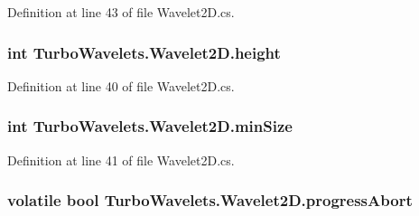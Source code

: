 \-Definition at line 43 of file \-Wavelet2\-D.\-cs.

\hypertarget{class_turbo_wavelets_1_1_wavelet2_d_afb2aa87b89b82f329357cbdc0cde18a8}{
\subsubsection[{height}]{\setlength{\rightskip}{0pt plus 5cm}int {\bf \-Turbo\-Wavelets.\-Wavelet2\-D.\-height}}}\label{class_turbo_wavelets_1_1_wavelet2_d_afb2aa87b89b82f329357cbdc0cde18a8}


\-Definition at line 40 of file \-Wavelet2\-D.\-cs.

\hypertarget{class_turbo_wavelets_1_1_wavelet2_d_af5148ef1a46dd5694ccea13aa8f1b9e2}{
\subsubsection[{min\-Size}]{\setlength{\rightskip}{0pt plus 5cm}int {\bf \-Turbo\-Wavelets.\-Wavelet2\-D.\-min\-Size}}}\label{class_turbo_wavelets_1_1_wavelet2_d_af5148ef1a46dd5694ccea13aa8f1b9e2}


\-Definition at line 41 of file \-Wavelet2\-D.\-cs.

\hypertarget{class_turbo_wavelets_1_1_wavelet2_d_adb4984a01d9ab29c0056b18cbbcdef6f}{
\subsubsection[{progress\-Abort}]{\setlength{\rightskip}{0pt plus 5cm}volatile bool {\bf \-Turbo\-Wavelets.\-Wavelet2\-D.\-progress\-Abort}}}\label{class_turbo_wavelets_1_1_wavelet2_d_adb4984a01d9ab29c0056b18cbbcdef6f}


